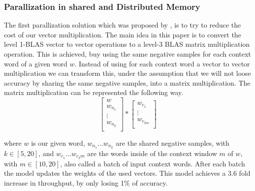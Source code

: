 \subsubsection{Parallization in shared and Distributed Memory}
The first parallization solution which was proposed by \cite{intel}, is to try to reduce the cost of our vector multiplication. The main idea in this paper is to convert the level 1-BLAS vector to vector operations to a level-3 BLAS matrix multiplication operation. This is achieved, buy using the same negative samples for each context word of a given word $w$. Instead of using for each context word a vector to vector multiplication we can transform this, under the assumption that we will not loose accuracy by sharing the same negative samples,  into a matrix multiplication. The matrix multiplication can be represented the following way.
\[
\begin{bmatrix}
w \\
w_{n_1}  \\
\vdots \\
w_{n_k}\\
\end{bmatrix}
*
\begin{bmatrix}
w_{c_1}\\
\vdots\\
w_{c_{2m}}\\
\end{bmatrix}
\]

where $w$ is our given word, $w_{n_1}...w_{n_k}$ are the shared negative samples, with $k \in [5,20]$, and $w_{c_1}...w_{c_2m}$ are the words inside of the context window $m$ of $w$, with $m \in [10,20]$, also called a batch of input context words. After each batch the model updates the weights of the used vectors. 
This model achieves a 3.6 fold increase in throughput, by only losing 1\% of accuracy. 
